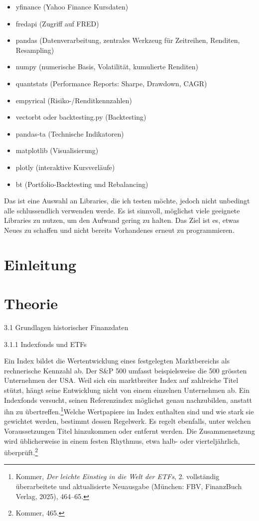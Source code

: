 \documentclass[
  ngerman,
  a4paper,
  DIV=11,
  oneside]{scrreprt}
\providecommand{\tightlist}{%
  \setlength{\itemsep}{0pt}\setlength{\parskip}{0pt}}
\begin{document}
\begin{itemize}
\tightlist
\item
  yfinance (Yahoo Finance Kursdaten)
\item
  fredapi (Zugriff auf FRED)
\item
  pandas (Datenverarbeitung, zentrales Werkzeug für Zeitreihen,
  Renditen, Resampling)
\item
  numpy (numerische Basis, Volatilität, kumulierte Renditen)
\item
  quantstats (Performance Reports: Sharpe, Drawdown, CAGR)
\item
  empyrical (Risiko-/Renditkennzahlen)
\item
  vectorbt oder backtesting.py (Backtesting)
\item
  pandas-ta (Technische Indikatoren)
\item
  matplotlib (Visualisierung)
\item
  plotly (interaktive Kursverläufe)
\item
  bt (Portfolio-Backtesting und Rebalancing)
\end{itemize}

Das ist eine Auswahl an Libraries, die ich testen möchte, jedoch nicht
unbedingt alle schlussendlich verwenden werde. Es ist sinnvoll,
möglichst viele geeignete Libraries zu nutzen, um den Aufwand gering zu
halten. Das Ziel ist es, etwas Neues zu schaffen und nicht bereits
Vorhandenes erneut zu programmieren.


\chapter{Einleitung}\label{einleitung}


\chapter{Theorie}\label{theorie}

3.1 Grundlagen historischer Finanzdaten

3.1.1 Indexfonds und ETFs

Ein Index bildet die Wertentwicklung eines festgelegten Marktbereichs
als rechnerische Kennzahl ab. Der S\&P 500 umfasst beispielsweise die
500 grössten Unternehmen der USA. Weil sich ein marktbreiter Index auf
zahlreiche Titel stützt, hängt seine Entwicklung nicht von einem
einzelnen Unternehmen ab. Ein Indexfonds versucht, seinen Referenzindex
möglichst genau nachzubilden, anstatt ihn zu
übertreffen.\footnote{Kommer, \emph{Der leichte Einstieg in die Welt der
  ETFs}, 2. vollständig überarbeitete und aktualisierte Neuausgabe
  (München: FBV, FinanzBuch Verlag, 2025), 464--65.}Welche Wertpapiere
im Index enthalten sind und wie stark sie gewichtet werden, bestimmt
dessen Regelwerk. Es regelt ebenfalls, unter welchen Voraussetzungen
Titel hinzukommen oder entfernt werden. Die Zusammensetzung wird
üblicherweise in einem festen Rhythmus, etwa halb- oder vierteljährlich,
überprüft.\footnote{Kommer, 465.}
\end{document}
